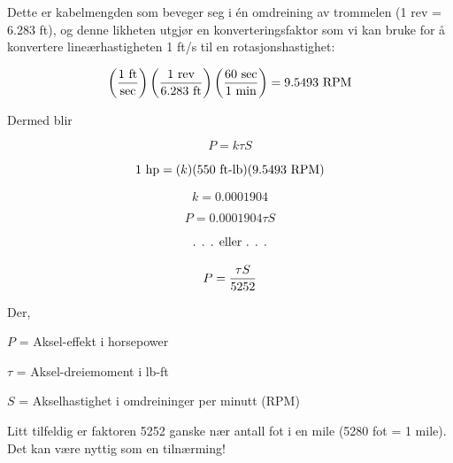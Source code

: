 Dette er kabelmengden som beveger seg i én omdreining av trommelen (1 rev = 6.283 ft), og denne likheten utgjør en konverteringsfaktor som vi kan bruke for å konvertere lineærhastigheten 1 ft/s til en rotasjonshastighet:

\vskip 10pt

$$\left({{1 \hbox{ ft}} \over \hbox{sec}} \right)  \left({{1 \hbox{ rev}} \over {6.283 \hbox{ ft}}}\right) \left( {{60 \hbox{ sec}} \over {1 \hbox{ min}}} \right) = 9.5493 \hbox{ RPM}$$

Dermed blir

$$P = k \tau S$$

$$1 \hbox{ hp}  = (k) (550 \hbox{ ft-lb}) (9.5493 \hbox{ RPM})$$

$$k = 0.0001904$$

$$P = 0.0001904 \tau S$$

$$\hbox{. . . eller . . .}$$

$$P = {{\tau S} \over 5252}$$

\noindent
Der,

$P$ = Aksel-effekt i horsepower

$\tau$ = Aksel-dreiemoment i lb-ft

$S$ = Akselhastighet i omdreininger per minutt (RPM)

\vskip 10pt

Litt tilfeldig er faktoren 5252 ganske nær antall fot i en mile (5280 fot = 1 mile). Det kan være nyttig som en tilnærming!










